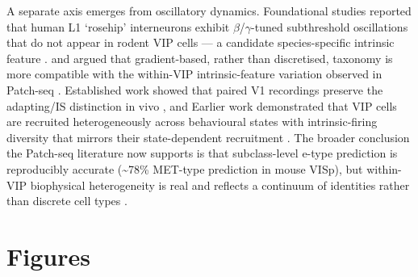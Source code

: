 \documentclass[11pt]{article}
\begin{document}
A separate axis emerges from oscillatory dynamics. Foundational studies reported that human L1 `rosehip' interneurons exhibit $\beta$/$\gamma$-tuned subthreshold oscillations that do not appear in rodent VIP cells --- a candidate species-specific intrinsic feature \citep{Boldog2018}. \citet{Bugeon2022} and \citet{Scala2021} argued that gradient-based, rather than discretised, taxonomy is more compatible with the within-VIP intrinsic-feature variation observed in Patch-seq \citep{Bugeon2022, Scala2021}. Established work showed that paired V1 recordings preserve the adapting/IS distinction in vivo \citep{Walker2016}, and Earlier work demonstrated that VIP cells are recruited heterogeneously across behavioural states with intrinsic-firing diversity that mirrors their state-dependent recruitment \citep{Jackson2016}. The broader conclusion the Patch-seq literature now supports is that subclass-level e-type prediction is reproducibly accurate ({\textasciitilde}78\% MET-type prediction in mouse VISp), but within-VIP biophysical heterogeneity is real and reflects a continuum of identities rather than discrete cell types \citep{Scala2021, Bugeon2022, Lee2023a, Bakken2021a}.

\section{Figures}\label{sec-05-figures}
\end{document}
